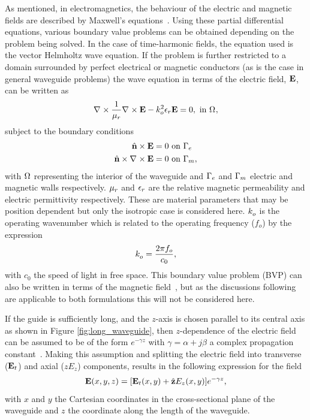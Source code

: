 As mentioned, in electromagnetics, the behaviour of the electric and
magnetic fields are described by Maxwell's equations~\cite{Jin2002,
Smi1997}.  Using these partial differential equations, various
boundary value problems can be obtained depending on the problem being
solved.  In the case of time-harmonic fields, the equation used is the
vector Helmholtz wave equation. If
the problem is further restricted to a domain surrounded by perfect
electrical or magnetic conductors (as is the case in general waveguide
problems) the wave equation in terms of the electric field, $\mathbf{E}$, can
be written as~\cite{Jin2002}
\begin{equation}
    \label{eqn:vector_helmholtz}
    \nabla_{} \times {\frac{1}{\mu_r}\nabla_{} \times {\ensuremath{\mathbf{E}}}} - k_{o}^{2}\epsilon_r\mathbf{E} = 0, \text{ in
    $\Omega_{}$},
\end{equation}
subject to the boundary conditions
\begin{align}
    \label{eqn:electric_wall_BC}
    \hat{\mathbf{n}}\times\mathbf{E} &= 0 \text{ on $\Gamma_{e}$}\\
    \label{eqn:magnetic_wall_BC}
    \hat{\mathbf{n}}\times\nabla_{} \times {\ensuremath{\mathbf{E}}} &= 0 \text{ on $\Gamma_{m}$},
\end{align}
with $\Omega_{}$ representing the interior of the waveguide and
$\Gamma_{e}$ and $\Gamma_{m}$ electric and magnetic walls
respectively. $\mu_r$ and $\epsilon_r$ are the relative magnetic permeability
and electric permittivity respectively.  These are material parameters
that may be position dependent but only the isotropic case is
considered here. $k_{o}^{}$ is the operating
wavenumber which is related to the
operating frequency ($f_o$) by the expression
\begin{equation}
 k_{o}^{} = \frac{2\pi f_o}{c_0},
\end{equation}
with $c_0$ the speed of light in free space.  This boundary value
problem (BVP) can also be written in terms of the magnetic
field~\cite{Jin2002}, but as the discussions following are applicable
to both formulations this will not be considered here.

If the guide is sufficiently long, and the $z$-axis is chosen parallel
to its central axis as shown in Figure \ref{fig:long_waveguide}, then
$z$-dependence of the electric field can be assumed to be of the form
$e^{-\gamma z}$ with $\gamma = \alpha + j\beta$ a complex
propagation constant~\cite{PelCoc1998,
Poz2005}.  Making this assumption and splitting the electric field
into transverse ($\mathbf{E}_t$) and axial ($\unit{z}E_z$) components,
results in the following expression for the field
\begin{equation}
    \label{eqn:field_components}
    \mathbf{E}(x,y,z) = [\mathbf{E}_t(x,y) + \hat{\mathbf{z}}E_z(x,y)]e^{-\gamma z},
\end{equation}
with $x$ and $y$ the Cartesian coordinates in the cross-sectional plane of the
waveguide and $z$ the coordinate along the length of the waveguide.

